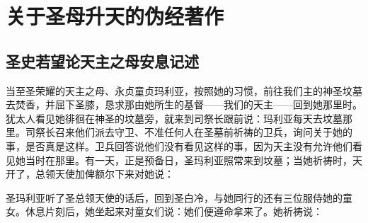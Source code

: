 
\chapter{关于圣母升天的伪经著作}



\section{圣史若望论天主之母安息记述}

当至圣荣耀的天主之母、永贞童贞玛利亚，按照她的习惯，前往我们主的神圣坟墓去焚香，并屈下圣膝，恳求那由她所生的基督——我们的天主——回到她那里时。犹太人看见她徘徊在神圣的坟墓旁，就来到司祭长跟前说：玛利亚每天去坟墓那里。司祭长召来他们派去守卫、不准任何人在圣墓前祈祷的卫兵，询问关于她的事，是否真是这样。卫兵回答说他们没有看见这样的事，因为天主没有允许他们看见她当时在那里。有一天，正是预备日，圣玛利亚照常来到坟墓；当她祈祷时，天开了，总领天使加俾额尔下来对她说：\par

圣玛利亚听了圣总领天使的话后，回到圣白冷，与她同行的还有三位服侍她的童女。休息片刻后，她坐起来对童女们说：她们便遵命拿来了。她祈祷说：\par

